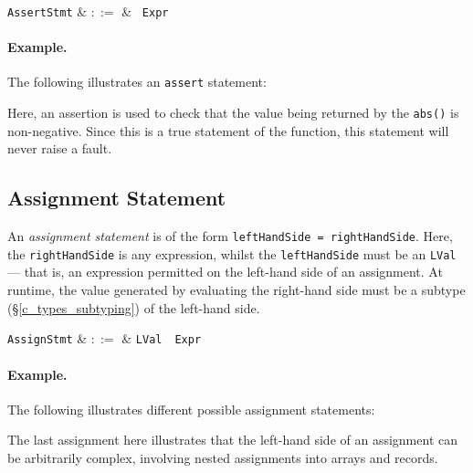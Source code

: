 \begin{syntax}
  \verb+AssertStmt+ & $::=$ & \ \verb+Expr+\\
\end{syntax}

\paragraph{Example.} The following illustrates an \lstinline{assert} statement:



Here, an assertion is used to check that the value being returned by the \lstinline{abs()} is non-negative.  Since this is a true statement of the function, this statement will never raise a fault.


\subsection{Assignment Statement}

An {\em assignment statement} is of the form \lstinline{leftHandSide = rightHandSide}.  Here, the \lstinline{rightHandSide} is any expression, whilst the \lstinline{leftHandSide} must be an \lstinline{LVal} --- that is, an expression permitted on the left-hand side of an assignment.  At runtime, the value generated by evaluating the right-hand side must be a subtype (\S\ref{c_types_subtyping}) of the left-hand side.

\begin{syntax}
  \verb+AssignStmt+ & $::=$ & \verb+LVal+\ \token{=}\ \verb+Expr+\\
\end{syntax}


\paragraph{Example.} The following illustrates different possible assignment statements:



The last assignment here illustrates that the left-hand side of an assignment can be arbitrarily complex, involving nested assignments into arrays and records.

